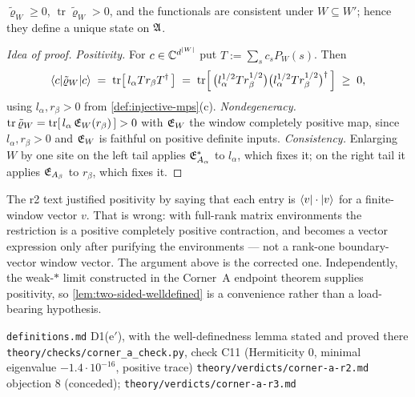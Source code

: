 \begin{lemma}
\label{lem:two-sided-welldefined}
$\tilde{\varrho}_{W} \ge 0$, $\operatorname{tr} \tilde{\varrho}_{W} > 0$, and
the functionals are consistent under $W \subseteq W'$; hence they define a
unique state on $\mathfrak{A}$.
\end{lemma}

\begin{proof}[Idea of proof]
\emph{Positivity.} For $c \in \mathbb{C}^{d^{\lvert W\rvert}}$ put
$T := \sum_{s} c_{s} P_{W}(s)$. Then
\begin{equation}
  \langle c| \tilde{\varrho}_{W} |c\rangle
  \;=\; \operatorname{tr}\bigl[\, l_{\alpha} T r_{\beta} T^{\dagger} \,\bigr]
  \;=\; \operatorname{tr}\Bigl[\,
        \bigl(l_{\alpha}^{1/2} T r_{\beta}^{1/2}\bigr)
        \bigl(l_{\alpha}^{1/2} T r_{\beta}^{1/2}\bigr)^{\dagger} \,\Bigr]
  \;\ge\; 0 ,
\end{equation}
using $l_{\alpha}, r_{\beta} > 0$ from \cref{def:injective-mps}(c).
\emph{Nondegeneracy.}
$\operatorname{tr} \tilde{\varrho}_{W}
 = \operatorname{tr}[\, l_{\alpha} \, \mathfrak{E}_{W}(r_{\beta}) \,] > 0$
with $\mathfrak{E}_{W}$ the window completely positive map, since
$l_{\alpha}, r_{\beta} > 0$ and $\mathfrak{E}_{W}$ is faithful on positive definite
inputs. \emph{Consistency.} Enlarging $W$ by one site on the left tail
applies $\mathfrak{E}_{A_{\alpha}}^{*}$ to $l_{\alpha}$, which fixes it; on the right
tail it applies $\mathfrak{E}_{A_{\beta}}$ to $r_{\beta}$, which fixes it.
\end{proof}

\begin{remark}
The r2 text justified positivity by saying that each entry is
$\langle v| \cdot |v\rangle$ for a finite-window vector $v$. That is wrong: with
full-rank matrix environments the restriction is a positive completely
positive contraction, and becomes a vector expression only after purifying the
environments --- not a rank-one boundary-vector window vector. The argument
above is the corrected one. Independently, the weak-$*$ limit constructed in
the Corner~A endpoint theorem supplies positivity, so
\cref{lem:two-sided-welldefined} is a convenience rather than a load-bearing
hypothesis.
\end{remark}

%
{\texttt{definitions.md} D1(e$'$), with the well-definedness lemma stated and
 proved there}%
{\texttt{theory/checks/corner\_a\_check.py}, check C11 (Hermiticity $0$,
 minimal eigenvalue $-1.4 \cdot 10^{-16}$, positive trace)}%
{\texttt{theory/verdicts/corner-a-r2.md} objection 8 (conceded);
 \texttt{theory/verdicts/corner-a-r3.md}}

